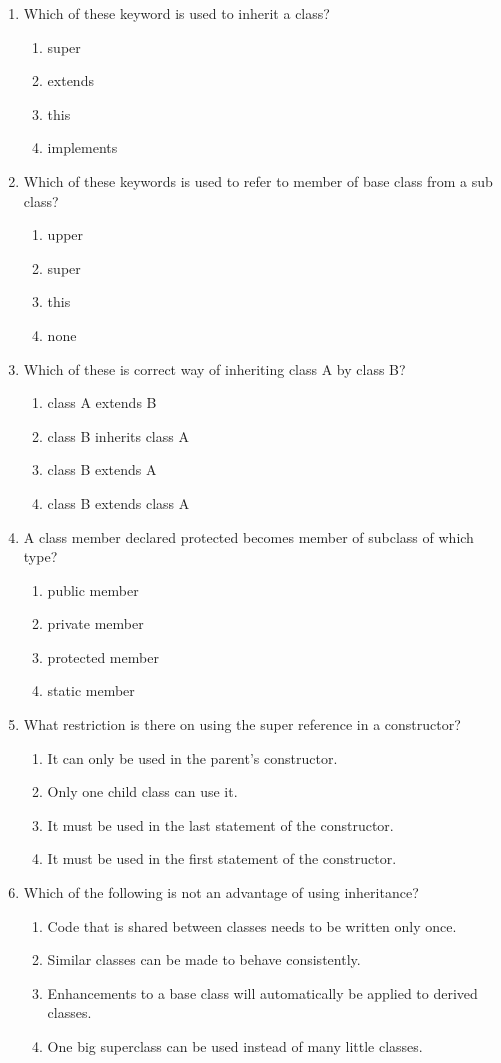 \documentclass[11pt,a4paper]{article}
\begin{document}
\begin{enumerate}
\item Which of these keyword is used to inherit a class?
\begin{enumerate}
\item super
\item extends
\item this
\item implements
\end{enumerate}
\item Which of these keywords is used to refer to member of base class from a sub class?
\begin{enumerate}
\item upper
\item super
\item this
\item none
\end{enumerate}
\item Which of these is correct way of inheriting class A by class B?
\begin{enumerate}
\item class A extends B {}
\item class B inherits class A {}
\item class B extends A {}
\item class B extends class A {}
\end{enumerate}
\item A class member declared protected becomes member of subclass of which type?
\begin{enumerate}
\item public member 
\item private member
\item protected member
\item static member
\end{enumerate}
\item  What restriction is there on using the super reference in a constructor?
\begin{enumerate}
\item It can only be used in the parent's constructor. 
\item Only one child class can use it. 
\item It must be used in the last statement of the constructor. 
\item It must be used in the first statement of the constructor. 
\end{enumerate}
\item  Which of the following is not an advantage of using inheritance?
\begin{enumerate}
\item Code that is shared between classes needs to be written only once. 
\item Similar classes can be made to behave consistently. 
\item Enhancements to a base class will automatically be applied to derived classes. 
\item One big superclass can be used instead of many little classes. 
\end{enumerate}
\end{enumerate}
\end{document}

